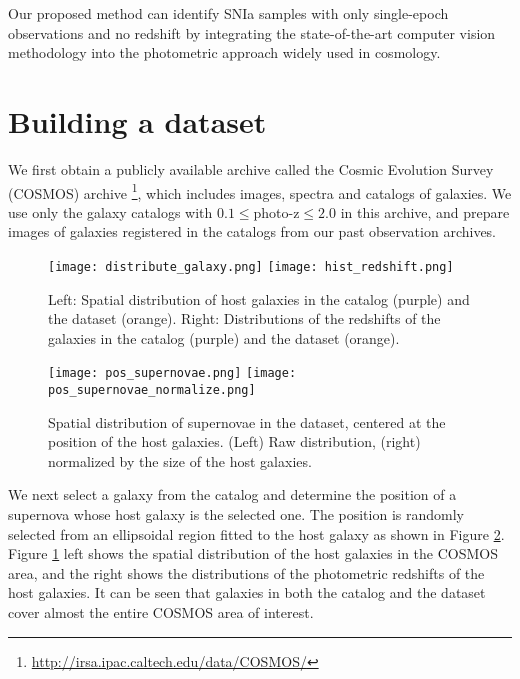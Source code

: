 \documentclass[conference,compsoc]{IEEEtran}
\begin{document}
  Our proposed method can identify SNIa samples with only single-epoch observations and no redshift by integrating the state-of-the-art computer vision methodology into the photometric approach widely used in cosmology.







\section{Building a dataset}
\label{sec:data}


  We first obtain a publicly available archive called the Cosmic Evolution Survey (COSMOS) archive \footnote{\url{http://irsa.ipac.caltech.edu/data/COSMOS/}}, which includes images, spectra and catalogs of galaxies.
  We use only the galaxy catalogs with $0.1\le$photo-z$\le 2.0$ in this archive, and prepare images of galaxies registered in the catalogs from our past observation archives.

\begin{figure}[t]
  \begin{center}
    \texttt{[image: distribute\_galaxy.png]}
    \texttt{[image: hist\_redshift.png]}
  \end{center}
  \caption{%
    Left: Spatial distribution of host galaxies in the catalog (purple) and the dataset (orange).
    Right: Distributions of the redshifts of the galaxies in the catalog (purple) and the dataset (orange).
  }
  \label{fig:distribute_galaxy}
\end{figure}

\begin{figure}[t]
  \begin{center}
    \texttt{[image: pos\_supernovae.png]}\hspace{7pt}
    \texttt{[image: pos\_supernovae\_normalize.png]}
  \end{center}
  \caption{%
    Spatial distribution of supernovae in the dataset, centered at the position of the host galaxies.
    (Left) Raw distribution, (right) normalized by the size of the host galaxies.
  }
  \label{fig:pos_supernovae}
\end{figure}

  We next select a galaxy from the catalog and determine the position of a supernova whose host galaxy is the selected one.
  The position is randomly selected from an ellipsoidal region fitted to the host galaxy as shown in Figure \ref{fig:pos_supernovae}.
  Figure \ref{fig:distribute_galaxy} left shows the spatial distribution of the host galaxies in the COSMOS area, and the right shows the distributions of the photometric redshifts of the host galaxies.
  It can be seen that galaxies in both the catalog and the dataset cover almost the entire COSMOS area of interest.
\end{document}
